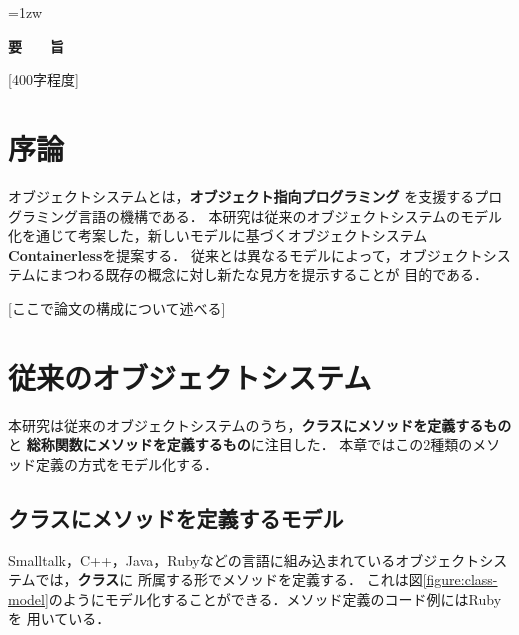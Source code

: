 \documentclass[a4paper,11pt,dvipdfmx]{jreport}
\title{\Underline{Containerless：オブジェクトシステムの新しいとらえ方}}
\author{林 拓人}
\begin{document}
\maketitle
\thispagestyle{empty}
\newpage

\thispagestyle{empty}
\vspace*{20pt plus 1fil}
\parindent=1zw
\noindent
\begin{center}
{\Large \bf 要　　旨}
\vspace{2cm}
\end{center}
[400字程度]

\par
\vspace{0pt plus 1fil}
\newpage

\tableofcontents
\listoffigures

\pagebreak \setcounter{page}{1}


\chapter{序論}

オブジェクトシステムとは，\textbf{オブジェクト指向プログラミング}\cite{Stroustrup:1988:OP:624569.624721}
を支援するプログラミング言語の機構である．
本研究は従来のオブジェクトシステムのモデル化を通じて考案した，新しいモデルに基づくオブジェクトシステム
\textbf{Containerless}を提案する．
従来とは異なるモデルによって，オブジェクトシステムにまつわる既存の概念に対し新たな見方を提示することが
目的である．

[ここで論文の構成について述べる]


\chapter{従来のオブジェクトシステム}

本研究は従来のオブジェクトシステムのうち，\textbf{クラスにメソッドを定義するもの}と
\textbf{総称関数にメソッドを定義するもの}に注目した．
本章ではこの2種類のメソッド定義の方式をモデル化する．

\section{クラスにメソッドを定義するモデル}
\label{section:class-model}

Smalltalk，C++，Java，Rubyなどの言語に組み込まれているオブジェクトシステムでは，\textbf{クラス}に
所属する形でメソッドを定義する．
これは図\ref{figure:class-model}のようにモデル化することができる．メソッド定義のコード例にはRubyを
用いている．
\end{document}
